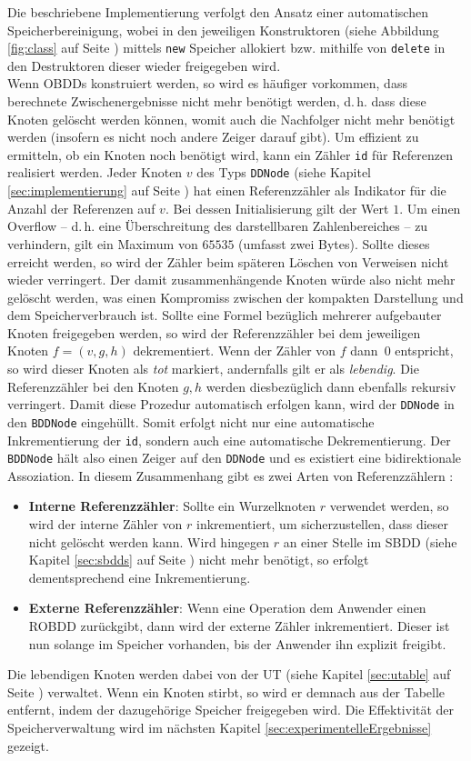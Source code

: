 Die beschriebene Implementierung verfolgt den Ansatz einer automatischen Speicherbereinigung, wobei in den jeweiligen Konstruktoren (siehe Abbildung \ref{fig:class} auf Seite \pageref{fig:class}) mittels \texttt{new} Speicher allokiert bzw. mithilfe von \texttt{delete} in den Destruktoren dieser wieder freigegeben wird.\\
Wenn OBDDs konstruiert werden, so wird es häufiger vorkommen, dass berechnete Zwischenergebnisse nicht mehr benötigt werden, d.\,h. dass diese Knoten gelöscht werden können, womit auch die Nachfolger nicht mehr benötigt werden (insofern es nicht noch andere Zeiger darauf gibt). Um effizient zu ermitteln, ob ein Knoten noch benötigt wird, kann ein Zähler \texttt{id} für Referenzen realisiert werden. Jeder Knoten $v$ des Typs \texttt{DDNode} (siehe Kapitel \ref{sec:implementierung} auf Seite \pageref{sec:implementierung}) hat einen Referenzzähler als Indikator für die Anzahl der Referenzen auf $v$. Bei dessen Initialisierung gilt der Wert $1$. Um einen Overflow -- d.\,h. eine Überschreitung des darstellbaren Zahlenbereiches -- zu verhindern, gilt ein Maximum von $65535$ (umfasst zwei Bytes). Sollte dieses erreicht werden, so wird der Zähler beim späteren Löschen von Verweisen nicht wieder verringert. Der damit zusammenhängende Knoten würde also nicht mehr gelöscht werden, was einen Kompromiss zwischen der kompakten Darstellung und dem Speicherverbrauch ist. Sollte eine Formel bezüglich mehrerer aufgebauter Knoten freigegeben werden, so wird der Referenzzähler bei dem jeweiligen Knoten $f = (v,g,h)$ dekrementiert. Wenn der Zähler von $f$ dann~$0$ entspricht, so wird dieser Knoten als \emph{tot} markiert, andernfalls gilt er als \emph{lebendig}. Die Referenzzähler bei den Knoten $g,h$ werden diesbezüglich dann ebenfalls rekursiv verringert. Damit diese Prozedur automatisch erfolgen kann, wird der \texttt{DDNode} in den \texttt{BDDNode} eingehüllt. Somit erfolgt nicht nur eine automatische Inkrementierung der \texttt{id}, sondern auch eine automatische Dekrementierung. Der \texttt{BDDNode} hält also einen Zeiger auf den \texttt{DDNode} und es existiert eine bidirektionale Assoziation. In diesem Zusammenhang gibt es zwei Arten von Referenzzählern \cite[S.31]{s1997}:
\begin{itemize}
	\item \textbf{Interne Referenzzähler}: Sollte ein Wurzelknoten $r$ verwendet werden, so wird der interne Zähler von $r$ inkrementiert, um sicherzustellen, dass dieser nicht gelöscht werden kann. Wird hingegen $r$ an einer Stelle im SBDD (siehe Kapitel \ref{sec:sbdds} auf Seite \pageref{sec:sbdds}) nicht mehr benötigt, so erfolgt dementsprechend eine Inkrementierung.
	\item \textbf{Externe Referenzzähler}: Wenn eine Operation dem Anwender einen ROBDD zurückgibt, dann wird der externe Zähler inkrementiert. Dieser ist nun solange im Speicher vorhanden, bis der Anwender ihn explizit freigibt.
\end{itemize}
Die lebendigen Knoten werden dabei von der UT (siehe Kapitel \ref{sec:utable} auf Seite \pageref{sec:utable}) verwaltet. Wenn ein Knoten stirbt, so wird er demnach aus der Tabelle entfernt, indem der dazugehörige Speicher freigegeben wird. Die Effektivität der Speicherverwaltung wird im nächsten Kapitel \ref{sec:experimentelleErgebnisse} gezeigt.
